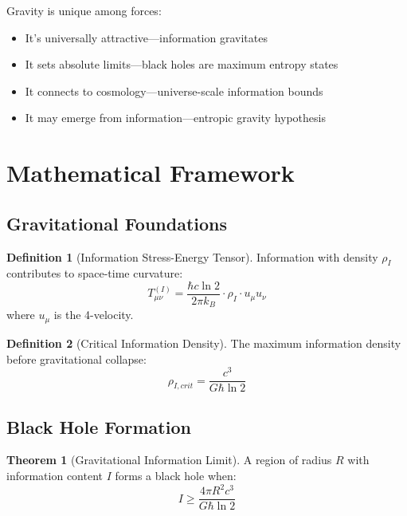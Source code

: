 \documentclass[11pt,a4paper]{article}
\theoremstyle{definition}
\newtheorem{definition}{Definition}[section]
\newtheorem{theorem}{Theorem}[section]
\begin{document}
Gravity is unique among forces:
\begin{itemize}
\item It's universally attractive—information gravitates
\item It sets absolute limits—black holes are maximum entropy states
\item It connects to cosmology—universe-scale information bounds
\item It may emerge from information—entropic gravity hypothesis
\end{itemize}

\section{Mathematical Framework}

\subsection{Gravitational Foundations}

\begin{definition}[Information Stress-Energy Tensor]
Information with density $\rho_I$ contributes to space-time curvature:
\begin{equation}
T^{(I)}_{\mu\nu} = \frac{\hbar c \ln 2}{2\pi k_B} \cdot \rho_I \cdot u_\mu u_\nu
\end{equation}
where $u_\mu$ is the 4-velocity.
\end{definition}

\begin{definition}[Critical Information Density]
The maximum information density before gravitational collapse:
\begin{equation}
\rho_{I,crit} = \frac{c^3}{G\hbar \ln 2}
\end{equation}
\end{definition}

\subsection{Black Hole Formation}

\begin{theorem}[Gravitational Information Limit]
A region of radius $R$ with information content $I$ forms a black hole when:
\begin{equation}
I \geq \frac{4\pi R^2 c^3}{G\hbar \ln 2}
\end{equation}
\end{theorem}
\end{document}
